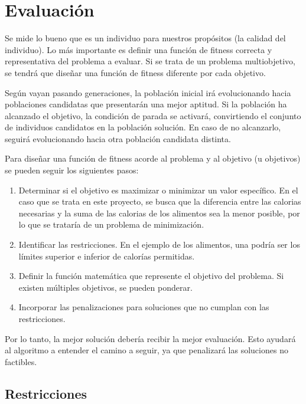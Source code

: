 \section{Evaluación}
\label{ch:evaluacion}

Se mide lo bueno que es un individuo para nuestros propósitos (la calidad del individuo). Lo más importante es definir una función de fitness correcta y representativa del problema a evaluar. Si se trata de un problema multiobjetivo, se tendrá que diseñar una función de fitness diferente por cada objetivo.

Según vayan pasando generaciones, la población inicial irá evolucionando hacia poblaciones candidatas que presentarán una mejor aptitud. Si la población ha alcanzado el objetivo, la condición de parada se activará, convirtiendo el conjunto de individuos candidatos en la población solución. En caso de no alcanzarlo, seguirá evolucionando hacia otra población candidata distinta.

Para diseñar una función de fitness acorde al problema y al objetivo (u objetivos) se pueden seguir los siguientes pasos:

\begin{enumerate}
  \item Determinar si el objetivo es maximizar o minimizar un valor específico. En el caso que se trata en este proyecto, se busca que la diferencia entre las calorias necesarias y la suma de las calorias de los alimentos sea la menor posible, por lo que se trataría de un problema de minimización.
  \item Identificar las restricciones. En el ejemplo de los alimentos, una podría ser los límites superior e inferior de calorías permitidas.
  \item Definir la función matemática que represente el objetivo del problema. Si existen múltiples objetivos, se pueden ponderar.
  \item Incorporar las penalizaciones para soluciones que no cumplan con las restricciones.
\end{enumerate}

Por lo tanto, la mejor solución debería recibir la mejor evaluación. Esto ayudará al algoritmo a entender el camino a seguir, ya que penalizará las soluciones no factibles.

\subsection{Restricciones}
\label{ch:restricciones}


